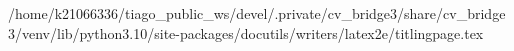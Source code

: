 /home/k21066336/tiago_public_ws/devel/.private/cv_bridge3/share/cv_bridge3/venv/lib/python3.10/site-packages/docutils/writers/latex2e/titlingpage.tex